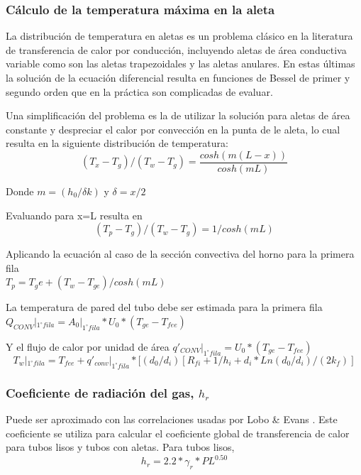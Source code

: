 \subsubsection{Cálculo de la temperatura máxima en la aleta}
\par La distribución de temperatura en aletas es un problema clásico en la
literatura de transferencia de calor por conducción, incluyendo aletas de área conductiva variable como son las aletas trapezoidales y las aletas anulares. En estas últimas la solución de la ecuación diferencial resulta en funciones de Bessel de primer y segundo orden que en la práctica son complicadas de evaluar.
\par Una simplificación del problema es la de utilizar la solución para aletas de área constante y despreciar el calor por convección en la punta de le aleta, lo cual resulta en la siguiente distribución de temperatura:
\begin{equation}
(T_x -T_g )/(T_w - T_g) = \frac{cosh(m(L-x))}{cosh(mL)}
\end{equation}
\par Donde $m = (h_0 / \delta k)$ y $\delta = x/2$
\par Evaluando para x=L resulta en
\begin{equation}
(T_p - T_g )/(T_w -T_g ) = 1 / cosh(mL)
\end{equation}
\par Aplicando la ecuación al caso de la sección convectiva del horno para la primera fila \\
$T_p = T_ge + (T_w -T_{ge}) / cosh(mL)$
\par La temperatura de pared del tubo debe ser estimada para la primera fila $Q_{CONV}|_{1^{\circ} fila} = A_0|_{1^{\circ} fila} *U_0 *
(T_{ge} - T_{fee})$
\par Y el flujo de calor por unidad de área $q\prime_{CONV}|_{1^{\circ} fila} = U_0 * (T_{ge} - T_{fee})$
\begin{equation}
T_w|_{1^{\circ} fila} = T_{fee} + q\prime_{conv}|_{1^{\circ} fila} *
[(d_0 /d_i ) [ R_{fi} + 1/h_i + d_i*Ln(d_0 /d_i)/(2k_f)]
\end{equation}

\subsubsection{Coeficiente de radiación del gas, $h_r$}
\par Puede ser aproximado con las correlaciones usadas por Lobo \& Evans \cite{bib:rad}. Este coeficiente se utiliza para calcular el coeficiente global de transferencia de calor para tubos lisos y tubos con aletas. 
Para tubos lisos,
\begin{equation}
h_r = 2.2 *\gamma_r *PL^{0.50}
\end{equation}

